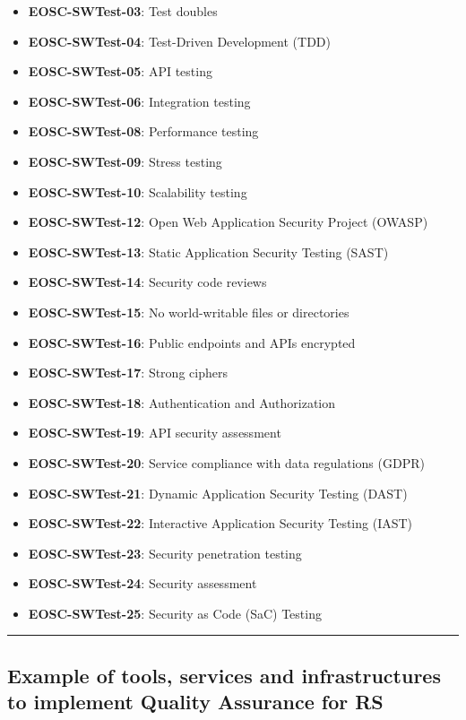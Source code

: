 \begin{itemize}
    \item \textbf{EOSC-SWTest-03}: Test doubles
    \item \textbf{EOSC-SWTest-04}: Test-Driven Development (TDD)
    \item \textbf{EOSC-SWTest-05}: API testing
    \item \textbf{EOSC-SWTest-06}: Integration testing
    \item \textbf{EOSC-SWTest-08}: Performance testing
    \item \textbf{EOSC-SWTest-09}: Stress testing
    \item \textbf{EOSC-SWTest-10}: Scalability testing
    \item \textbf{EOSC-SWTest-12}: Open Web Application Security Project (OWASP)
    \item \textbf{EOSC-SWTest-13}: Static Application Security Testing (SAST)
    \item \textbf{EOSC-SWTest-14}: Security code reviews
    \item \textbf{EOSC-SWTest-15}: No world-writable files or directories
    \item \textbf{EOSC-SWTest-16}: Public endpoints and APIs encrypted
    \item \textbf{EOSC-SWTest-17}: Strong ciphers
    \item \textbf{EOSC-SWTest-18}: Authentication and Authorization
    \item \textbf{EOSC-SWTest-19}: API security assessment
    \item \textbf{EOSC-SWTest-20}: Service compliance with data regulations (GDPR)
    \item \textbf{EOSC-SWTest-21}: Dynamic Application Security Testing (DAST)
    \item \textbf{EOSC-SWTest-22}: Interactive Application Security Testing (IAST)
    \item \textbf{EOSC-SWTest-23}: Security penetration testing
    \item \textbf{EOSC-SWTest-24}: Security assessment
    \item \textbf{EOSC-SWTest-25}: Security as Code (SaC) Testing
\end{itemize}
\hrule

\subsection{Example of tools, services and infrastructures to implement Quality Assurance for RS}

